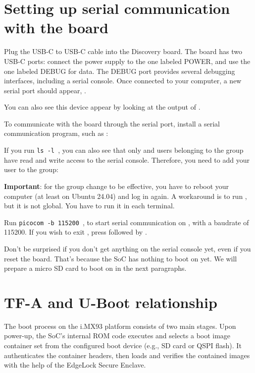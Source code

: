 \section{Setting up serial communication with the board}

Plug the USB-C to USB-C cable into the Discovery board. The board has two USB-C ports: connect the power supply to the one labeled POWER, and use the one labeled DEBUG for data. The DEBUG port provides several debugging interfaces, including a serial console. Once connected to your computer, a new serial port should appear, {\tt \hosttty}.

You can also see this device appear by looking at the output of
.

To communicate with the board through the serial port, install a
serial communication program, such as :


If you run {\tt ls -l \hosttty}, you can also see that only
 and users belonging to the  group have
read and write access to the serial console. Therefore, you need
to add your user to the  group:


{\bf Important}: for the group change to be effective, you have to
reboot your computer (at least on Ubuntu 24.04) and log in again.
A workaround is to run , but it is not global.
You have to run it in each terminal.

Run {\tt picocom -b 115200 \hosttty}, to start serial
communication on {\tt \hosttty}, with a baudrate of 115200.
If you wish to exit , press \code{[Ctrl][a]} followed by
\code{[Ctrl][x]}.

Don't be surprised if you don't get anything on the serial console yet,
even if you reset the board. That's because the SoC has nothing to boot
on yet. We will prepare a micro SD card to boot on in the next paragraphs.

\section{TF-A and U-Boot relationship}

The boot process on the i.MX93 platform consists of two main stages. Upon
power-up, the SoC’s internal ROM code executes and selects a boot image
container set from the configured boot device (e.g., SD card or QSPI flash). It
authenticates the container headers, then loads and verifies the contained
images with the help of the EdgeLock Secure Enclave.

